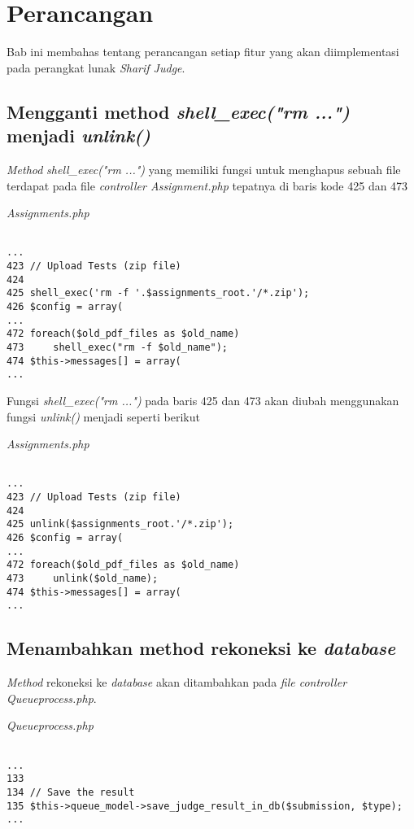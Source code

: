 \chapter{Perancangan}
\label{chap:perancangan}

Bab ini membahas tentang perancangan setiap fitur yang akan diimplementasi pada perangkat lunak \textit{Sharif Judge}. 

\section{Mengganti method \textit{shell\_exec("rm ...")} menjadi \textit{unlink()}}
\textit{Method} \textit{shell\_exec("rm ...")} yang memiliki fungsi untuk menghapus sebuah file terdapat pada file \textit{controller Assignment.php} tepatnya di baris kode 425 dan 473

\textit{Assignments.php}
\begin{lstlisting}[basicstyle=\ttfamily, frame=single,
columns=fullflexible, keepspaces=true]

...
423	// Upload Tests (zip file)
424	
425	shell_exec('rm -f '.$assignments_root.'/*.zip');
426	$config = array(
...
472	foreach($old_pdf_files as $old_name)
473		shell_exec("rm -f $old_name");
474	$this->messages[] = array(
...

\end{lstlisting}

Fungsi \textit{shell\_exec("rm ...")} pada baris 425 dan 473 akan diubah menggunakan fungsi \textit{unlink()} menjadi seperti berikut

\textit{Assignments.php}
\begin{lstlisting}[basicstyle=\ttfamily, frame=single,
columns=fullflexible, keepspaces=true]

...
423	// Upload Tests (zip file)
424	
425	unlink($assignments_root.'/*.zip');
426	$config = array(
...
472	foreach($old_pdf_files as $old_name)
473		unlink($old_name);
474	$this->messages[] = array(
...

\end{lstlisting}

\section{Menambahkan method rekoneksi ke \textit{database}}
\textit{Method} rekoneksi ke \textit{database} akan ditambahkan pada \textit{file controller Queueprocess.php}. 

\textit{Queueprocess.php}
\begin{lstlisting}[basicstyle=\ttfamily, frame=single,
columns=fullflexible, keepspaces=true]

...
133
134	// Save the result
135	$this->queue_model->save_judge_result_in_db($submission, $type);
...

\end{lstlisting}

